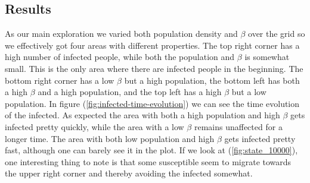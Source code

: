 \subsection{Results}
As our main exploration we varied both population density and $\beta$ over the grid so we effectively got four areas with different properties. The top
right corner has a high number of infected people, while both the population and $\beta$ is somewhat small. This is the only area where there are infected people in the
beginning. The bottom right corner has a low $\beta$ but a high population, the bottom left has both a high $\beta$ and a high population, and the top left has a high $\beta$ but
a low population.
In figure (\ref{fig:infected-time-evolution}) we can see the time evolution of the infected.
As expected the area with both a high population and high $\beta$ gets infected pretty quickly, while the area with a low $\beta$ remains unaffected for a longer time.
The area with both low population and high $\beta$ gets infected pretty fast, although one can barely see it in the plot. If we look at (\ref{fig:state_10000}), one interesting thing
to note is that some susceptible seem to migrate towards the upper right corner and thereby avoiding the infected somewhat.

